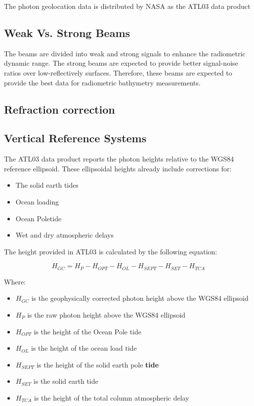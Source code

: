 The photon geolocation data is distributed by NASA as the ATL03 data product

\subsection{Weak Vs. Strong Beams}

The beams are divided into weak and strong signals to enhance the radiometric dynamic range. The strong beams are expected to provide better signal-noise ratios over low-reflectively surfaces.\cite{Neumann2019d} Therefore, these beams are expected to provide the best data for radiometric bathymetry measurements.

\subsection{Refraction correction}


\subsection{Vertical Reference Systems}

The ATL03 data product reports the photon heights relative to the WGS84 reference ellipsoid. These ellipsoidal heights already include corrections for:
\begin{itemize}
      \item The solid earth tides 
      \item Ocean loading 
      \item Ocean Poletide 
      \item Wet and dry atmospheric delays
\end{itemize}
 
The height provided in ATL03 is calculated by the following equation:

\[H_{GC} =  H_{P} - H_{OPT} - H_{OL} - H_{SEPT} - H_{SET} - H_{TCA}\]

Where:

\begin{itemize}

      \item \(H_{GC}\) is the geophysically corrected photon height above the WGS84 ellipsoid
      \item \(H_{P}\) is the raw photon height above the WGS84 ellipsoid
      \item \(H_{OPT}\) is the height of the Ocean Pole tide
      \item \(H_{OL}\) is the height of the ocean load tide
      \item \(H_{SEPT}\) is the height of the solid earth pole \textbf{tide}
      \item \(H_{SET}\) is the solid earth tide
      \item \(H_{TCA}\) is the height of the total column atmospheric delay
\end{itemize}

